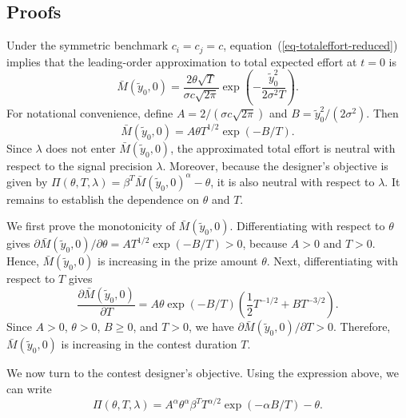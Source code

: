 \documentclass[mnsc]{informs3}
\begin{document}
\begin{APPENDICES}


\section{Proofs}

Under the symmetric benchmark $c_i=c_j=c$, equation~(\ref{eq-totaleffort-reduced}) implies that the leading-order approximation to total expected effort at $t=0$ is
\begin{equation*}
\bar M(\tilde y_0,0)
=
\frac{2\theta\sqrt{T}}{\sigma c\sqrt{2\pi}}
\exp\left(
-\frac{\tilde y_0^2}{2\sigma^2T}
\right).
\end{equation*}
For notational convenience, define $A=2/(\sigma c\sqrt{2\pi})$ and $B=\tilde y_0^2/(2\sigma^2)$. Then
\begin{equation*}
\bar M(\tilde y_0,0)
=
A\theta T^{1/2}\exp(-B/T).
\end{equation*}
Since $\lambda$ does not enter $\bar M(\tilde y_0,0)$, the approximated total effort is neutral with respect to the signal precision $\lambda$. Moreover, because the designer's objective is given by $\Pi(\theta,T,\lambda)=\beta^T\bar M(\tilde y_0,0)^\alpha-\theta$, it is also neutral with respect to $\lambda$. It remains to establish the dependence on $\theta$ and $T$.

We first prove the monotonicity of $\bar M(\tilde y_0,0)$. Differentiating with respect to $\theta$ gives $\partial \bar M(\tilde y_0,0)/\partial \theta=A T^{1/2}\exp(-B/T)>0$, because $A>0$ and $T>0$. Hence, $\bar M(\tilde y_0,0)$ is increasing in the prize amount $\theta$.
Next, differentiating with respect to $T$ gives
\begin{equation*}
\frac{\partial \bar M(\tilde y_0,0)}{\partial T}
=
A\theta \exp(-B/T)
\left(
\frac{1}{2}T^{-1/2}
+
BT^{-3/2}
\right).
\end{equation*}
Since $A>0$, $\theta>0$, $B\geq 0$, and $T>0$, we have $\partial \bar M(\tilde y_0,0)/\partial T>0$. Therefore, $\bar M(\tilde y_0,0)$ is increasing in the contest duration $T$.

We now turn to the contest designer's objective. Using the expression above, we can write
\begin{equation*}
\Pi(\theta,T,\lambda)
=
A^\alpha \theta^\alpha \beta^T T^{\alpha/2}\exp(-\alpha B/T)-\theta.
\end{equation*}


\end{APPENDICES}
\end{document}
